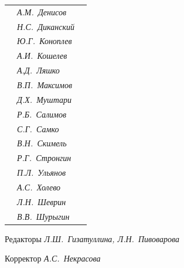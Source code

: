 \begin{tabular}{p{63mm}p{40mm}p{50mm}}
                               &   \it А.М.~Денисов & \\


                               &   \it Н.С.~Диканский & \\


                               &   \it Ю.Г.~Коноплев & \\


                               &   \it А.И.~Кошелев  & \\


                               &   \it А.Д.~Ляшко  & \\


                               &   \it В.П.~Максимов  & \\


                               &   \it Д.Х.~Муштари & \\


                               &   \it Р.Б.~Салимов  & \\


                               &   \it С.Г.~Самко  & \\


                               &   \it В.Н.~Скимель &  \\


                               &   \it Р.Г.~Стронгин  & \\


                               &   \it П.Л.~Ульянов  & \\


                               &   \it А.С.~Холево  & \\


                               &   \it Л.Н.~Шеврин  & \\


                               &   \it В.В.~Шурыгин  & \\


\end{tabular} 


\bigskip 


\bigskip 


\bigskip 





 


\centerline{Редакторы \it Л.Ш.~Гизатуллина, Л.Н.~Пивоварова}


\centerline{Корректор \it А.С.~Некрасова}


